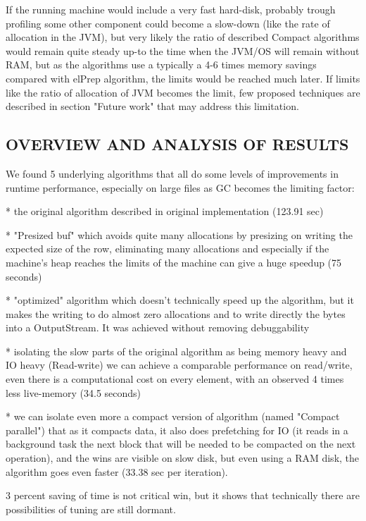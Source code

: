 \documentclass[a4paper,twoside]{article}
\begin{document}
If the running machine would include a very fast hard-disk, probably trough profiling some other component could become a slow-down (like the rate of allocation in the JVM), but very likely
the ratio of described Compact algorithms would remain quite steady up-to the time when the JVM/OS will remain without RAM, but as the algorithms use a typically a 4-6 times memory 
savings compared with elPrep algorithm, the limits would be reached much later. If limits like the ratio of allocation of JVM becomes the limit, few proposed techniques are described in section
"Future work" that may address this limitation.


\subsection{\uppercase{Overview and analysis of results}}

We found 5 underlying algorithms that all do some levels of improvements in runtime performance, especially on large files
as GC becomes the limiting factor:

* the original algorithm described in original implementation (123.91 sec)

* "Presized buf" which avoids quite many allocations by presizing on writing the expected size of the row, eliminating
many allocations and especially if the machine's heap reaches the limits of the machine can give a huge speedup (75 seconds)

* "optimized" algorithm which doesn't technically speed up the algorithm, but it makes the writing to do almost zero
allocations and to write directly the bytes into a OutputStream. It was achieved without removing debuggability

* isolating the slow parts of the original algorithm as being memory heavy and IO heavy (Read-write) we can achieve a
comparable performance on read/write, even there is a computational cost on every element, with an observed 4 times
less live-memory (34.5 seconds)

* we can isolate even more a compact version of algorithm (named "Compact parallel") that as it compacts data, it also does prefetching for IO (it reads in a background task the next block that will be needed to be compacted on the next operation),
and the wins are visible on slow disk, but even using a RAM disk, the algorithm goes even faster (33.38 sec per iteration).

3 percent saving of time is not critical win, but it shows that technically there are possibilities of tuning are still dormant.
\end{document}
